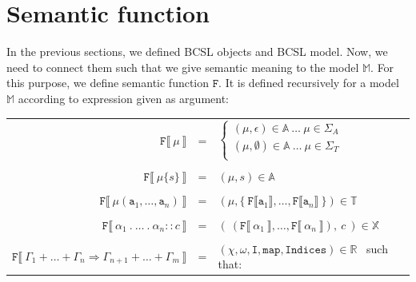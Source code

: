 \documentclass[12pt]{fithesis2}
\begin{document}
\section{Semantic function}

In the previous sections, we defined BCSL objects and BCSL model. Now, we need to connect them such that we give semantic meaning to the model $\mathds{M}$. For this purpose, we define semantic function $\mathtt{F}$. It is defined recursively for a model $\mathds{M}$ according to expression given as argument:

\begin{center}
\begin{tabular}{ r c l}
$\mathtt{F} \llbracket ~\mu~ \rrbracket$ & = &
    $\begin{cases}
    (\mu, \epsilon) \in \mathds{A} ~\ldots~ \mu \in \Sigma_{A}\\
    (\mu, \emptyset) \in \mathds{A} ~\ldots~ \mu \in \Sigma_{T}\\
    \end{cases}
    $\\
 & & \\
$\mathtt{F} \llbracket ~\mu\{s\}~ \rrbracket$ & = & $(\mu, s) \in \mathds{A}$\\
 & & \\
$\mathtt{F} \llbracket ~\mu(\mathtt{a}_1, \ldots, \mathtt{a}_n)~ \rrbracket$ & = &
$(\mu, \{~ \mathtt{F} \llbracket \mathtt{a}_1 \rrbracket, \ldots, \mathtt{F} \llbracket \mathtt{a}_n \rrbracket ~\}) \in \mathds{T}$\\
 & & \\
$\mathtt{F} \llbracket ~\alpha_1~.~\ldots~.~\alpha_n :: c~ \rrbracket$ & = &
$(~(\mathtt{F} \llbracket ~\alpha_1~ \rrbracket, \ldots, \mathtt{F} \llbracket ~\alpha_n~ \rrbracket), ~c~) \in \mathds{X}$\\
 & & \\
$\mathtt{F} \llbracket ~\Gamma_1 + \ldots + \Gamma_n \Rightarrow \Gamma_{n+1} + \ldots + \Gamma_m~ \rrbracket$ & = &
$(\chi, \omega, \mathtt{I}, \mathtt{map}, \mathtt{Indices}) \in \mathds{R}$~ such that:\\
\end{tabular}
\end{center}
\end{document}
